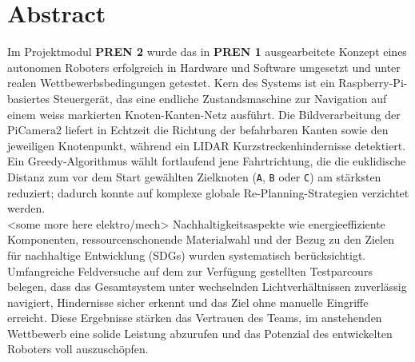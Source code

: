 \documentclass[main.tex]{subfiles} %
\begin{document}
\section*{Abstract}

Im Projektmodul \textbf{PREN 2} wurde das in \textbf{PREN 1} ausgearbeitete
Konzept eines autonomen Roboters erfolgreich in Hardware und Software
umgesetzt und unter realen Wettbewerbsbedingungen getestet.
Kern des Systems ist ein Raspberry-Pi-basiertes Steuergerät, das eine
endliche Zustandsmaschine zur Navigation auf einem weiss markierten
Knoten-Kanten-Netz ausführt. Die Bildverarbeitung der PiCamera2
liefert in Echtzeit die Richtung der befahrbaren Kanten sowie den
jeweiligen Knotenpunkt, während ein LIDAR Kurzstreckenhindernisse
detektiert. Ein Greedy-Algorithmus wählt fortlaufend jene Fahrtrichtung,
die die euklidische Distanz zum vor dem Start gewählten Zielknoten
(\texttt{A}, \texttt{B} oder \texttt{C}) am stärksten reduziert; dadurch
konnte auf komplexe globale Re-Planning-Strategien verzichtet werden.\\

<some more here elektro/mech>
Nachhaltigkeitsaspekte wie energieeffiziente Komponenten, ressourcenschonende
Materialwahl und der Bezug zu den Zielen für nachhaltige Entwicklung (SDGs) wurden
systematisch berücksichtigt.\\

Umfangreiche Feldversuche auf dem zur Verfügung gestellten Testparcours belegen,
dass das Gesamtsystem unter wechselnden Lichtverhältnissen zuverlässig
navigiert, Hindernisse sicher erkennt und das Ziel ohne manuelle Eingriffe
erreicht. Diese Ergebnisse stärken das Vertrauen des Teams, im anstehenden
Wettbewerb eine solide Leistung abzurufen und das Potenzial des entwickelten
Roboters voll auszuschöpfen.
\end{document}
